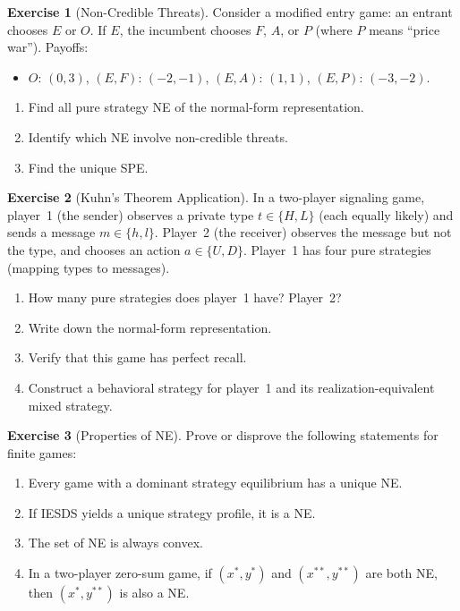 \documentclass[11pt,a4paper]{article}
\theoremstyle{definition}
\newtheorem{exercise}{Exercise}[section]
\theoremstyle{plain}
\theoremstyle{remark}
\begin{document}
\begin{exercise}[Non-Credible Threats]
\label{ex:noncredible}
Consider a modified entry game: an entrant chooses $E$ or $O$. If $E$, the incumbent
chooses $F$, $A$, or $P$ (where $P$ means ``price war''). Payoffs:
\begin{itemize}[nosep]
    \item $O$: $(0, 3)$, \quad $(E, F)$: $(-2, -1)$, \quad $(E, A)$: $(1, 1)$, \quad $(E, P)$: $(-3, -2)$.
\end{itemize}
\begin{enumerate}[nosep,label=(\alph*)]
    \item Find all pure strategy NE of the normal-form representation.
    \item Identify which NE involve non-credible threats.
    \item Find the unique SPE.
\end{enumerate}
\end{exercise}

\begin{exercise}[Kuhn's Theorem Application]
\label{ex:kuhn}
In a two-player signaling game, player~1 (the sender) observes a private type
$t \in \{H, L\}$ (each equally likely) and sends a message $m \in \{h, l\}$.
Player~2 (the receiver) observes the message but not the type, and chooses an action
$a \in \{U, D\}$. Player~1 has four pure strategies (mapping types to messages).
\begin{enumerate}[nosep,label=(\alph*)]
    \item How many pure strategies does player~1 have? Player~2?
    \item Write down the normal-form representation.
    \item Verify that this game has perfect recall.
    \item Construct a behavioral strategy for player~1 and its realization-equivalent
    mixed strategy.
\end{enumerate}
\end{exercise}

\begin{exercise}[Properties of NE]
\label{ex:ne_properties}
Prove or disprove the following statements for finite games:
\begin{enumerate}[nosep,label=(\alph*)]
    \item Every game with a dominant strategy equilibrium has a unique NE.
    \item If IESDS yields a unique strategy profile, it is a NE.
    \item The set of NE is always convex.
    \item In a two-player zero-sum game, if $(x^*, y^*)$ and $(x^{**}, y^{**})$ are
    both NE, then $(x^*, y^{**})$ is also a NE.
\end{enumerate}
\end{exercise}
\end{document}
